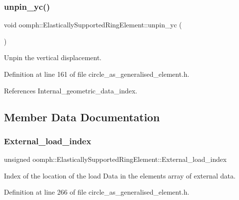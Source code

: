 \subsubsection{\texorpdfstring{unpin\+\_\+yc()}{unpin\_yc()}}
{\footnotesize\ttfamily void oomph\+::\+Elastically\+Supported\+Ring\+Element\+::unpin\+\_\+yc (\begin{DoxyParamCaption}{ }\end{DoxyParamCaption})\hspace{0.3cm}{\ttfamily [inline]}}



Unpin the vertical displacement. 



Definition at line 161 of file circle\+\_\+as\+\_\+generalised\+\_\+element.\+h.



References Internal\+\_\+geometric\+\_\+data\+\_\+index.



\subsection{Member Data Documentation}
\mbox{\label{classoomph_1_1ElasticallySupportedRingElement_a800f0a57477dc63df13aaea5c99a5f30}} 
\subsubsection{\texorpdfstring{External\+\_\+load\+\_\+index}{External\_load\_index}}
{\footnotesize\ttfamily unsigned oomph\+::\+Elastically\+Supported\+Ring\+Element\+::\+External\+\_\+load\+\_\+index\hspace{0.3cm}{\ttfamily [private]}}



Index of the location of the load Data in the element\textquotesingle{}s array of external data. 



Definition at line 266 of file circle\+\_\+as\+\_\+generalised\+\_\+element.\+h.



